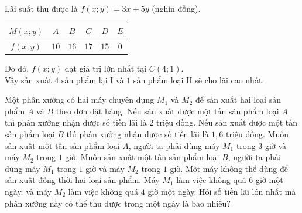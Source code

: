 \begin{bt}
{	Lãi suất thu được là $f(x;y)=3x+5y$ (nghìn đồng).
	\begin{center}
	\begin{tabular}{|c|c|c|c|c|c|}
		\hline
	$M(x;y)$	& $A$ & $B$ & $C$ & $D$ & $E$ \\
		\hline
	$f(x;y)$	& $10$ & $16$ & $17$ & $15$ & $0$ \\
		\hline
	\end{tabular}
	\end{center}
Do đó, $f(x;y)$ đạt giá trị lớn nhất tại $C(4;1)$.\\
Vậy sản xuất $4$ sản phẩm lại I và $1$ sản phẩm loại II sẽ cho lãi cao nhất.
	}
\end{bt}

\begin{bt}%
	Một phân xưởng có hai máy chuyên dụng $M_1$ và $M_2$ để sản xuất hai loại sản phẩm $A$ và $B$ theo đơn đặt hàng. Nếu sản xuất được một tấn sản phẩm loại $A$ thì phân xưởng nhận được số tiền lãi là $2$ triệu đồng. Nếu sản xuất được một tấn sản phẩm loại $B$ thì phân xưởng nhận được số tiền lãi là $1{,}6$ triệu đồng. Muốn sản xuất một tấn sản phẩm loại $A$, người ta phải dùng máy $M_1$ trong $3$ giờ và máy $M_2$ trong $1$ giờ. Muốn sản xuất một tấn sản phẩm loại $B$, người ta phải dùng máy $M_1$ trong $1$ giờ và máy $M_2$ trong $1$ giờ. Một máy không thể dùng để sản xuất đồng thời hai loại sản phẩm. Máy $M_1$ làm việc không quá $6$ giờ một ngày. và máy $M_2$ làm việc không quá $4$ giờ một ngày. Hỏi số tiền lãi lớn nhất mà phân xưởng này có thể thu được trong một ngày là bao nhiêu?
\end{bt}
